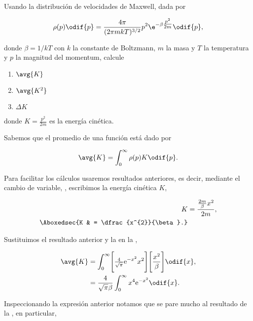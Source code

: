\documentclass[../main.tex]{subfiles}
\begin{document}
\begin{problema}[10]
	Usando la distribución de velocidades de Maxwell, dada por

	\begin{equation*}
		\rho(p)\odif{p} = \dfrac{4\pi}{(2\pi m k T)^{3/2}}p^{2}\e^{-\beta \tfrac{p^{2}}{2m}}\odif{p},
	\end{equation*}

	donde \(\beta = 1/kT\) con \(k\) la constante de Boltzmann,
	\(m\) la masa y \(T\) la temperatura y
	\(p\) la magnitud del momentum, calcule

	\begin{enumerate}
		\item \(\avg{K}\)
		\item \(\avg{K^{2}}\)
		\item \(\Delta K\)
	\end{enumerate}

	donde \(K = \tfrac{p^{2}}{2m}\) es la energía cinética.

	\startsolution

	Sabemos que el promedio de una función está dado por

	\begin{equation}
		\avg{K} = \int_{0}^{\infty} \rho(p)K \odif{p}.
		\label{eq:avg}
	\end{equation}

	Para facilitar los cálculos usaremos resultados anteriores, es decir, mediante el
	cambio de variable, , escribimos la energía cinética
	\(K\),

	\begin{align}
		K            & = \dfrac{\tfrac{2m}{\beta}x^{2}}{2m},\nonumber   \\
		\Aboxedsec{K & = \dfrac{x^{2}}{\beta}.}\label{eq:kineticEnergy}
	\end{align}

	Sustituimos el resultado anterior y la  en la
	,

	\begin{align*}
		\avg{K} & = \int_{0}^{\infty} \Biggl[\tfrac{4}{\sqrt{\pi}}\mathrm{e}^{-x^{2}}x^{2}\Biggr]\Biggl[\dfrac{x^{2}}{\beta}\Biggr]\odif{x}, \\
		        & = \dfrac{4}{\sqrt{\pi}\beta} \int_{0}^{\infty} x^{4}\mathrm{e}^{-x^{2}}\odif{x}.
	\end{align*}

	Inspeccionando la expresión anterior notamos que se pare mucho al resultado de la
	, en particular,


\end{problema}
\end{document}
